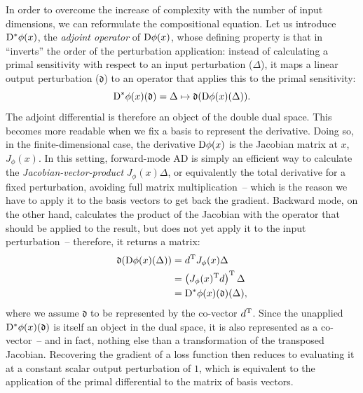 In order to overcome the increase of complexity with the number of input dimensions, we can
reformulate the compositional equation.  Let us introduce \(\mathop{}\!\mathrm{D}^{*} \phi(x)\), the \emph{adjoint
  operator} of \(\mathop{}\!\mathrm{D} \phi(x)\), whose defining property is that in \enquote{inverts} the order of
the perturbation application: instead of calculating a primal sensitivity with respect to an input
perturbation (\(\Delta\)), it maps a linear output perturbation (\(\mathfrak{d}\)) to an operator
that applies this to the primal sensitivity:
\begin{equation}
  \mathop{}\!\mathrm{D}^{*} \phi(x)(\mathfrak{d}) = \Delta \mapsto \mathfrak{d}(\mathop{}\!\mathrm{D} \phi(x)(\Delta)).
\end{equation}
The adjoint differential is therefore an object of the double dual space.  This becomes more
readable when we fix a basis to represent the derivative.  Doing so, in the finite-dimensional case,
the derivative \(\mathop{}\!\mathrm{D} \phi(x)\) is the Jacobian matrix at \(x\), \(J_{\phi}(x)\).  In this setting,
forward-mode AD is simply an efficient way to calculate the \emph{Jacobian-vector-product}
\(J_{\phi}(x) \Delta\), or equivalently the total derivative for a fixed perturbation, avoiding full
matrix multiplication~-- which is the reason we have to apply it to the basis vectors to get back
the gradient.  Backward mode, on the other hand, calculates the product of the Jacobian with the
operator that should be applied to the result, but does not yet apply it to the input
perturbation~-- therefore, it returns a matrix:
\begin{equation}
  \begin{aligned}
    \mathfrak{d} (\mathop{}\!\mathrm{D} \phi(x)(\Delta)) &= d^{\mathrm{T}} J_{\phi}(x) \Delta \\
    &= \left( J_{\phi}(x)^{\mathrm{T}} d \right)^{\mathrm{T}} \Delta \\
    &= \mathop{}\!\mathrm{D}^{*} \phi(x)(\mathfrak{d})(\Delta),
  \end{aligned}
\end{equation}
where we assume \(\mathfrak{d}\) to be represented by the co-vector \(d^{\mathrm{T}}\).  Since the
unapplied \(\mathop{}\!\mathrm{D}^{*} \phi(x)(\mathfrak{d})\) is itself an object in the dual space, it is also
represented as a co-vector~-- and in fact, nothing else than a transformation of the transposed
Jacobian.  Recovering the gradient of a loss function then reduces to evaluating it at a constant
scalar output perturbation of \(1\), which is equivalent to the application of the primal
differential to the matrix of basis vectors.

